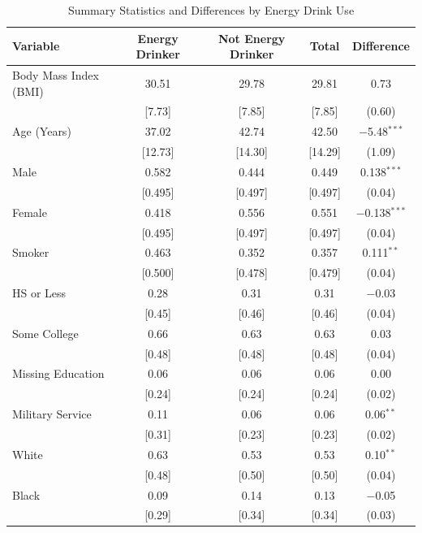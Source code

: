 \begin{table}[htbp]
\centering
\caption{Summary Statistics and Differences by Energy Drink Use}
\label{tab:summary}
\small
\begin{tabular}{lcccc}
\toprule
\textbf{Variable} & \textbf{Energy Drinker} & \textbf{Not Energy Drinker} & \textbf{Total} & \textbf{Difference} \\
\midrule
Body Mass Index (BMI) & 30.51 & 29.78 & 29.81 & 0.73 \\
                      & [7.73] & [7.85] & [7.85] & (0.60) \\
Age (Years)           & 37.02 & 42.74 & 42.50 & $-$5.48$^{***}$ \\
                      & [12.73] & [14.30] & [14.29] & (1.09) \\
Male                  & 0.582 & 0.444 & 0.449 & 0.138$^{***}$ \\
                      & [0.495] & [0.497] & [0.497] & (0.04) \\
Female                & 0.418 & 0.556 & 0.551 & $-$0.138$^{***}$ \\
                      & [0.495] & [0.497] & [0.497] & (0.04) \\
Smoker                & 0.463 & 0.352 & 0.357 & 0.111$^{**}$ \\
                      & [0.500] & [0.478] & [0.479] & (0.04) \\
HS or Less            & 0.28 & 0.31 & 0.31 & $-$0.03 \\
                      & [0.45] & [0.46] & [0.46] & (0.04) \\
Some College          & 0.66 & 0.63 & 0.63 & 0.03 \\
                      & [0.48] & [0.48] & [0.48] & (0.04) \\
Missing Education     & 0.06 & 0.06 & 0.06 & 0.00 \\
                      & [0.24] & [0.24] & [0.24] & (0.02) \\
Military Service      & 0.11 & 0.06 & 0.06 & 0.06$^{**}$ \\
                      & [0.31] & [0.23] & [0.23] & (0.02) \\
White                 & 0.63 & 0.53 & 0.53 & 0.10$^{**}$ \\
                      & [0.48] & [0.50] & [0.50] & (0.04) \\
Black                 & 0.09 & 0.14 & 0.13 & $-$0.05 \\
                      & [0.29] & [0.34] & [0.34] & (0.03) \\

\end{tabular}
\end{table}
